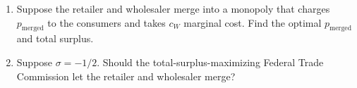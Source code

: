\documentclass[11pt]{article}
\begin{document}
\begin{enumerate}
     \item Suppose the retailer and wholesaler merge into a monopoly that charges $p_{\text{merged}}$ to the consumers and takes $c_W$ marginal cost. Find the optimal $p_{\text{merged}}$ and total surplus.  
         
     \item Suppose $\sigma = -1/2$. Should the total-surplus-maximizing Federal Trade Commission let the retailer and wholesaler merge?
     
    

\end{enumerate}
\end{document}
